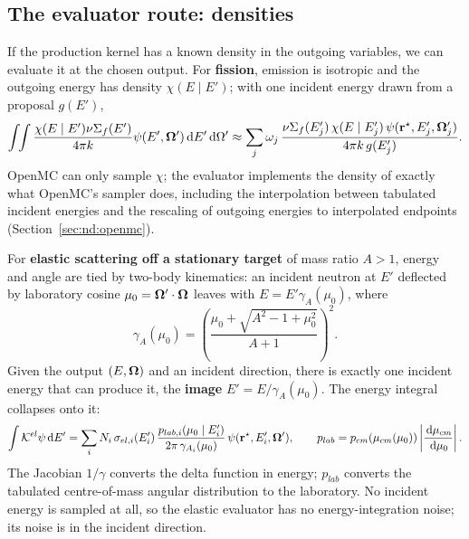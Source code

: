 \subsection{The evaluator route: densities}

If the production kernel has a known density in the outgoing variables, we can evaluate it at the
chosen output. For \textbf{fission}, emission is isotropic and the outgoing energy has density
$\chi(E\mid E')$; with one incident energy drawn from a proposal $g(E')$,
\begin{equation}\label{eq:fission_eval}
\int\!\!\int \frac{\chi(E\mid E')\nu\Sigma_f(E')}{4\pi k}\psi(E',\boldsymbol\Omega')\,\mathrm d E'\,\mathrm d\Omega'
\approx \sum_j\omega_j\,\frac{\nu\Sigma_f(E'_j)\,\chi(E\mid E'_j)\,\psi(\mathbf r^\star,E'_j,\boldsymbol\Omega'_j)}{4\pi k\,g(E'_j)} .
\end{equation}
OpenMC can only sample $\chi$; the evaluator implements the density of exactly what OpenMC's sampler
does, including the interpolation between tabulated incident energies and the rescaling of outgoing
energies to interpolated endpoints (Section~\ref{sec:nd:openmc}).

For \textbf{elastic scattering off a stationary target} of mass ratio $A>1$, energy and angle are tied
by two-body kinematics: an incident neutron at $E'$ deflected by laboratory cosine
$\mu_0=\boldsymbol\Omega'\cdot\boldsymbol\Omega$ leaves with $E=E'\gamma_A(\mu_0)$, where
\begin{equation}
\gamma_A(\mu_0)=\left(\frac{\mu_0+\sqrt{A^2-1+\mu_0^2}}{A+1}\right)^2 .
\end{equation}
Given the output $(E,\boldsymbol\Omega)$ and an incident direction, there is exactly one incident energy that can
produce it, the \textbf{image} $E'=E/\gamma_A(\mu_0)$. The energy integral collapses onto it:
\begin{equation}\label{eq:elastic_image}
\int\mathcal K^{el}\psi\,\mathrm d E'=\sum_iN_i\,\sigma_{el,i}(E'_i)\,
\frac{p_{lab,i}(\mu_0\mid E'_i)}{2\pi\,\gamma_{A_i}(\mu_0)}\,\psi(\mathbf r^\star,E'_i,\boldsymbol\Omega'),
\qquad p_{lab}=p_{cm}(\mu_{cm}(\mu_0))\left|\frac{\,\mathrm d\mu_{cm}}{\,\mathrm d\mu_0}\right| .
\end{equation}
The Jacobian $1/\gamma$ converts the delta function in energy; $p_{lab}$ converts the tabulated
centre-of-mass angular distribution to the laboratory. No incident energy is sampled at all, so the
elastic evaluator has no energy-integration noise; its noise is in the incident direction.

